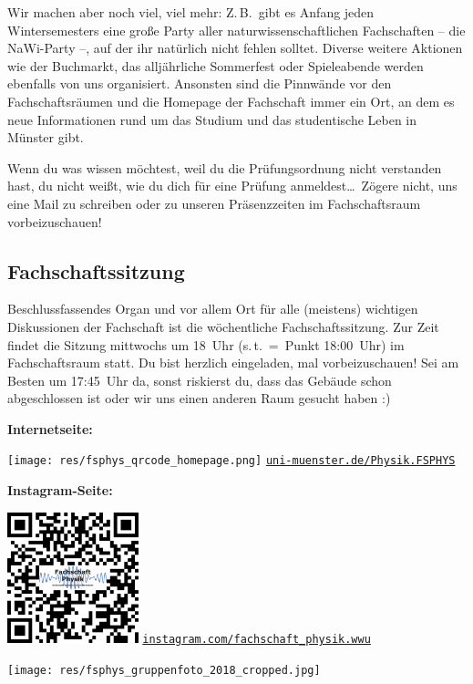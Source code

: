 \begin{multicols}{2}
Wir machen aber noch viel, viel mehr: Z.\,B.\ gibt es Anfang jeden Wintersemesters eine große Party aller naturwissenschaftlichen Fachschaften -- die NaWi-Party --, auf der ihr natürlich nicht fehlen solltet.
Diverse weitere Aktionen wie der Buchmarkt, das alljährliche Sommerfest oder Spieleabende werden ebenfalls von uns organisiert.
Ansonsten sind die Pinnwände vor den Fachschaftsräumen und die Homepage der Fachschaft immer ein Ort, an dem es neue Informationen rund um das Studium und das studentische Leben in Münster gibt.

Wenn du was wissen möchtest, weil du die Prüfungsordnung nicht verstanden hast, du nicht weißt, wie du dich für eine Prüfung anmeldest\dots\
Zögere nicht, uns eine Mail zu schreiben oder zu unseren Präsenzzeiten im Fachschaftsraum vorbeizuschauen!

\subsection*{Fachschaftssitzung}
Beschlussfassendes Organ und vor allem Ort für alle (meistens) wichtigen Diskussionen  der Fachschaft ist die wöchentliche Fachschaftssitzung.
Zur Zeit findet die Sitzung mittwochs um 18~Uhr (s.\,t.~=~Punkt 18:00~Uhr) im Fachschaftsraum statt.
Du bist herzlich eingeladen, mal vorbeizuschauen! Sei am Besten um 17:45~Uhr da, sonst riskierst du, dass das Gebäude schon abgeschlossen ist oder wir uns einen anderen Raum gesucht haben :)

\begin{minipage}{\columnwidth}
	\begin{minipage}[t]{5cm}
		\raggedright\parskip=0.1cm
		\textbf{Internetseite:}
	
		\texttt{[image: res/fsphys\_qrcode\_homepage.png]}
		\scriptsize
		\href{https://www.uni-muenster.de/Physik.FSPHYS/}{\texttt{uni-muenster.de/Physik.FSPHYS}}
	\end{minipage}
	\hfill
	\begin{minipage}[t]{4cm}
		\raggedleft\parskip=0.1cm
		\textbf{Instagram-Seite:}
	
		\includegraphics[width=3.8cm]{res/fsphys_qrcode_instagram.pdf}
		\scriptsize
		\href{https://www.instagram.com/fachschaft_physik.wwu}{\texttt{instagram.com/fachschaft\_physik.wwu}}
	\end{minipage}
\end{minipage}
\end{multicols}
\vfill
\begin{center}
	\vspace{-2mm}
	\texttt{[image: res/fsphys\_gruppenfoto\_2018\_cropped.jpg]}
\end{center}

